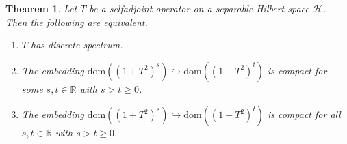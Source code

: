 \documentclass[a4paper,10pt,reqno]{amsart}
\newcommand{\R}{\mathbb{R}}
\newcommand{\Hil}{\mathscr{H}}
\newcommand{\embed}{\hookrightarrow}%
\newcommand{\dom}{\mathrm{dom}}
\newtheorem{theorem}{Theorem}[section]
\theoremstyle{definition}
\begin{document}
\begin{theorem}
\label{Thm:AbsCpctEmbed}
Let $T$ be a selfadjoint operator on a separable Hilbert space $\Hil$.
Then the following are equivalent.
\begin{enumerate}[label=(\roman*), labelwidth=0pt, labelindent=2pt, leftmargin=21pt]
\item \label{It:AbsCpctEmbed:1}
$T$ has discrete spectrum.
\item \label{It:AbsCpctEmbed:2} 
The embedding $\dom((1+T^2)^s) \embed \dom((1+T^2)^t)$ is compact for some $s, t \in \R$ with $s > t\ge0$.
\item  \label{It:AbsCpctEmbed:3} 
The embedding $\dom((1+T^2)^s) \embed \dom((1+T^2)^t)$ is compact for all $s, t \in \R$ with $s > t\ge0$.
\end{enumerate}
\end{theorem}
\end{document}
